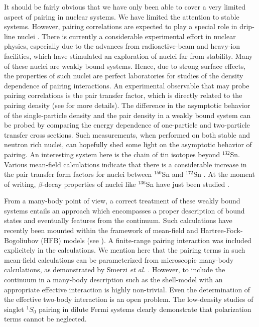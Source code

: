 \documentclass[rmp,preprint,aps,floatfix]{revtex4}
\begin{document}
It should be fairly obvious that we have only been able to cover
a very limited aspect of pairing in nuclear systems.
We have limited the attention to stable systems. However, 
pairing correlations are expected to play a special role
in drip-line nuclei \cite{dob_96}. There is currently a considerable
experimental effort in nuclear physics, especially due to the 
advances from radioactive-beam and heavy-ion 
facilities, which  have stimulated an exploration of 
nuclei far from stability. Many of these nuclei are weakly bound systems.
Hence, due to strong surface effects, the properties of such nuclei
are perfect laboratories for studies of the density dependence of 
pairing interactions. An experimental observable that may probe
pairing correlations is the pair transfer factor, which is directly related 
to the pairing density (see \cite{jacekwitek1998} for more details). 
The difference in the asymptotic behavior of 
the single-particle density and the pair density in a weakly bound system can 
be probed by comparing the energy dependence 
of one-particle and two-particle transfer cross sections.
Such measurements, when performed on both stable and neutron rich nuclei,
can hopefully shed some light on the asymptotic behavior of pairing. 
An interesting system here is the chain of tin isotopes beyond $^{132}$Sn.
Various mean-field calculations \cite{dob_96} indicate that there is a
considerable increase in the pair transfer form factors for nuclei 
between  $^{150}$Sn and  $^{172}$Sn \cite{dob_96}. At the moment of writing,
$\beta$-decay properties of nuclei like  $^{136}$Sn have just been studied
\cite{shergur2002}. 
 
From a many-body point of view, a 
correct treatment of these weakly bound systems
entails an approach which encompasses a proper description of bound states and eventually features from the continuum. Such calculations have recently been mounted within the framework of mean-field and Hartree-Fock-Bogoliubov (HFB) 
models (see \cite{sandulescu2001,sandulescu2002}). A 
finite-range pairing 
interaction was included explicitely in the calculations. 
We mention here that the pairing terms in such mean-field calculations
can be parameterized from microscopic many-body calculations, as demonstrated
by Smerzi {\em et al.} \cite{smerzi1997}.
However, 
to include
the continuum in a many-body description such as the shell-model with an
appropriate effective interaction is highly non-trivial. Even the determination
of the effective two-body interaction is an open problem. The low-density
studies of singlet $^1S_0$ pairing in dilute Fermi systems \cite{henning2000}
clearly demonstrate that polarization terms cannot be neglected. 
\end{document}
